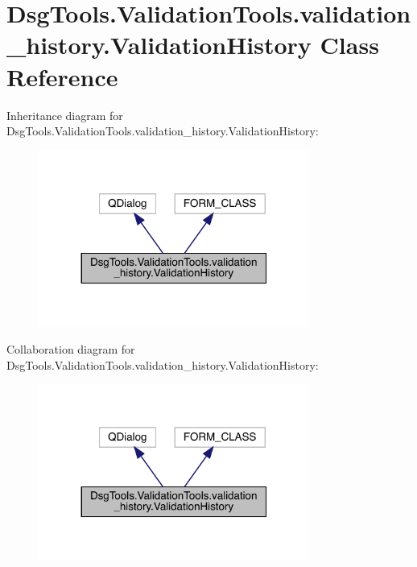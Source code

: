 \hypertarget{class_dsg_tools_1_1_validation_tools_1_1validation__history_1_1_validation_history}{}\section{Dsg\+Tools.\+Validation\+Tools.\+validation\+\_\+history.\+Validation\+History Class Reference}
\label{class_dsg_tools_1_1_validation_tools_1_1validation__history_1_1_validation_history}


Inheritance diagram for Dsg\+Tools.\+Validation\+Tools.\+validation\+\_\+history.\+Validation\+History\+:
\nopagebreak
\begin{figure}[H]
\begin{center}
\leavevmode
\includegraphics[width=251pt]{class_dsg_tools_1_1_validation_tools_1_1validation__history_1_1_validation_history__inherit__graph}
\end{center}
\end{figure}


Collaboration diagram for Dsg\+Tools.\+Validation\+Tools.\+validation\+\_\+history.\+Validation\+History\+:
\nopagebreak
\begin{figure}[H]
\begin{center}
\leavevmode
\includegraphics[width=251pt]{class_dsg_tools_1_1_validation_tools_1_1validation__history_1_1_validation_history__coll__graph}
\end{center}
\end{figure}
